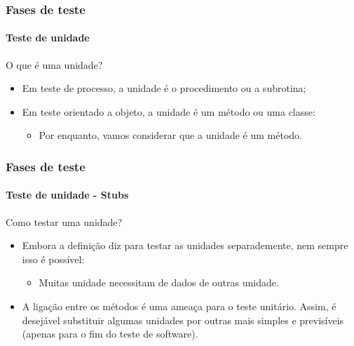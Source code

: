 \begin{frame}
\frametitle{Fases de teste}
\framesubtitle{Teste de unidade}

\begin{block:fact}{O que é uma unidade?}
\begin{itemize}
	\item Em teste de processo, a unidade é o procedimento ou a subrotina;

	\item Em teste orientado a objeto, a unidade é um método ou uma classe:
	\begin{itemize}
		\item Por enquanto, vamos considerar que a unidade é um método.
	\end{itemize}
\end{itemize}
\end{block:fact}
\end{frame}



\begin{frame}
\frametitle{Fases de teste}
\framesubtitle{Teste de unidade - Stubs}
  
\begin{block:fact}{Como testar uma unidade?}
\begin{itemize}
	\item Embora a definição diz para testar as unidades separademente, nem sempre isso é possível:
	\begin{itemize}
		\item Muitas unidade necessitam de dados de outras unidade.
	\end{itemize}

	\item A ligação entre os métodos é uma ameaça para o teste unitário. Assim, é desejável substituir algumas unidades por outras mais simples e previsíveis (apenas para o fim do teste de software).
\end{itemize}
\end{block:fact}
\end{frame}



